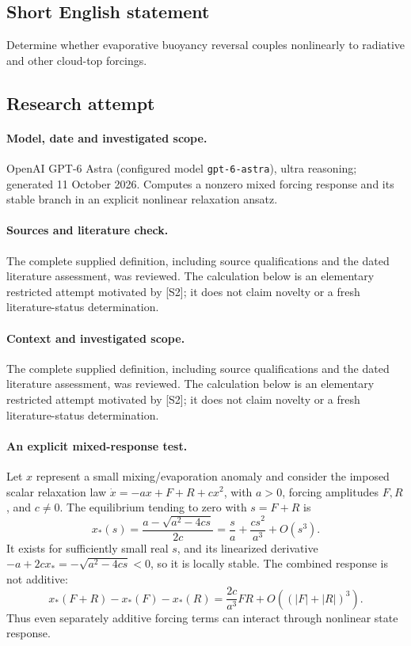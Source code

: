 \documentclass[11pt]{article}
\begin{document}
\subsection{Short English statement}
Determine whether evaporative buoyancy reversal couples nonlinearly to radiative and other cloud-top forcings.
\subsection{Research attempt}
\paragraph{Model, date and investigated scope.}
OpenAI GPT-6 Astra (configured model \texttt{gpt-6-astra}), ultra reasoning; generated 11 October 2026. Computes a nonzero mixed forcing response and its stable branch in an explicit nonlinear relaxation ansatz.

\paragraph{Sources and literature check.}
The complete supplied definition, including source qualifications and the dated literature assessment, was reviewed. The calculation below is an elementary restricted attempt motivated by [S2]; it does not claim novelty or a fresh literature-status determination.

\paragraph{Context and investigated scope.} The complete supplied definition, including source qualifications and the dated literature assessment, was reviewed. The calculation below is an elementary restricted attempt motivated by [S2]; it does not claim novelty or a fresh literature-status determination.

\paragraph{An explicit mixed-response test.} Let $x$ represent a small mixing/evaporation anomaly and consider the imposed scalar relaxation law $\dot x=-ax+F+R+cx^2$, with $a>0$, forcing amplitudes $F,R$, and $c\ne0$. The equilibrium tending to zero with $s=F+R$ is
\[
 x_*(s)=\frac{a-\sqrt{a^2-4cs}}{2c}
 =\frac{s}{a}+\frac{cs^2}{a^3}+O(s^3).
\]
It exists for sufficiently small real $s$, and its linearized derivative $-a+2cx_*=-\sqrt{a^2-4cs}<0$, so it is locally stable. The combined response is not additive:
\[
 x_*(F+R)-x_*(F)-x_*(R)=\frac{2c}{a^3}FR+O((|F|+|R|)^3).
\]
Thus even separately additive forcing terms can interact through nonlinear state response.
\end{document}
